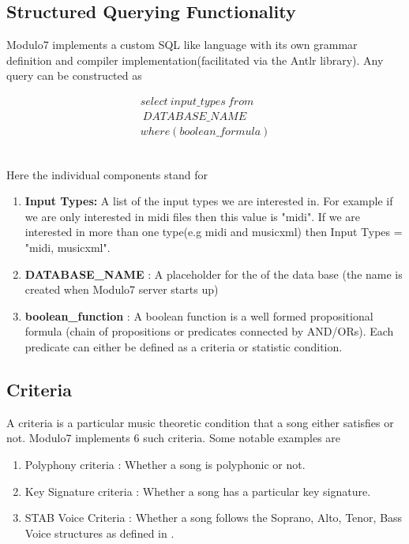 \documentclass{article}
\begin{document}
\subsection{Structured Querying Functionality} \label{structuredquery}

\noindent Modulo7 implements a custom SQL like language with its own grammar definition and compiler implementation(facilitated via the Antlr library). Any query can be constructed as 

\begin{equation}
\begin{aligned}
select \ input\_types \ from \\\ DATABASE\_NAME \\ where (boolean\_formula)
\end{aligned}
\end{equation}

\noindent \\ Here the individual components stand for 

\begin{enumerate}
\item \textbf{Input Types: } A list of the input types we are interested in. For example if we are only interested in midi files then this value is "midi". If we are interested in more than one type(e.g midi and musicxml) then Input Types = "midi, musicxml". 
\item \textbf{DATABASE\_NAME} : A placeholder for the of the data base (the name is created when Modulo7 server starts up)
\item \textbf{boolean\_function} : A boolean function is a well formed propositional formula (chain of propositions or predicates connected by AND/ORs). Each predicate can either be defined as a criteria or statistic condition.   
\end{enumerate}

\subsection{Criteria}

A criteria is a particular music theoretic condition that a song either satisfies or not. Modulo7 implements 6 such criteria. Some notable examples are 

\begin{enumerate}
\item Polyphony criteria : Whether a song is polyphonic or not.
\item Key Signature criteria : Whether a song has a particular key signature.
\item STAB Voice Criteria : Whether a song follows the Soprano, Alto, Tenor, Bass Voice structures as defined in \cite{satbcriteria}.
\end{enumerate}
\end{document}
